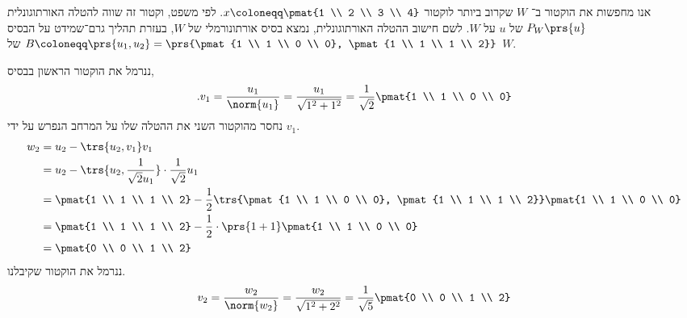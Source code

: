 \documentclass[a4paper,10pt,twoside,openany]{article}
\begin{document}
\begin{solution}
אנו מחפשות את הוקטור ב־%
$W$
שקרוב ביותר לוקטור
$x \coloneqq \pmat{1 \\ 2 \\ 3 \\ 4}$.
לפי משפט, וקטור זה שווה להטלה האורתוגונלית $P_W\prs{u}$ של
$u$
על
$W$.
לשם חישוב ההטלה האורתוגונלית, נמצא בסיס אורתונורמלי של
$W$,
בעזרת תהליך גרם־שמידט על הבסיס
$B \coloneqq \prs{u_1, u_2} = \prs{\pmat{1 \\ 1 \\ 0 \\ 0}, \pmat{1 \\ 1 \\ 1 \\ 2}}$
של
$W$.

ננרמל את הוקטור הראשון בבסיס,
\[\text{.} v_1 = \frac{u_1}{\norm{u_1}} = \frac{u_1}{\sqrt{1^2 + 1^2}} = \frac{1}{\sqrt{2}} \pmat{1 \\ 1 \\ 0 \\ 0}\]
נחסר מהוקטור השני את ההטלה שלו על המרחב הנפרש על ידי
$v_1$.
\begin{align*}
w_2 &= u_2 - \trs{u_2, v_1} v_1
\\&=
u_2 - \trs{u_2, \frac{1}{\sqrt{2} u_1}} \cdot \frac{1}{\sqrt{2}} u_1
\\&=
\pmat{1 \\ 1 \\ 1 \\ 2} - \frac{1}{2} \trs{\pmat{1 \\ 1 \\ 0 \\ 0}, \pmat{1 \\ 1 \\ 1 \\ 2}} \pmat{1 \\ 1 \\ 0 \\ 0}
\\&=
\pmat{1 \\ 1 \\ 1 \\ 2} - \frac{1}{2} \cdot \prs{1 + 1} \pmat{1 \\ 1 \\ 0 \\ 0}
\\&=
\pmat{0 \\ 0 \\ 1 \\ 2}
\end{align*}
ננרמל את הוקטור שקיבלנו.
\begin{align*}
v_2 = \frac{w_2}{\norm{w_2}} = \frac{w_2}{\sqrt{1^2 + 2^2}} = \frac{1}{\sqrt{5}} \pmat{0 \\ 0 \\ 1 \\ 2}
\end{align*}


\end{solution}
\end{document}
